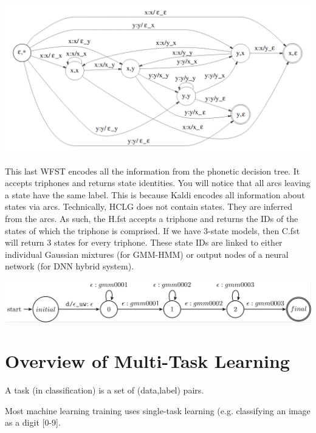 \documentclass[10pt,a4paper]{article}
\begin{document}
\begin{center}
  \includegraphics[width=.9\textwidth,keepaspectratio]{figs/mohri-C.png}
\end{center}

This last WFST encodes all the information from the phonetic decision tree. It accepts triphones and returns state identities. You will notice that all arcs leaving a state have the same label. This is because Kaldi encodes all information about states via arcs. Technically, HCLG does not contain states. They are inferred from the arcs. As such, the H.fst accepts a triphone and returns the IDs of the states of which the triphone is comprised. If we have 3-state models, then C.fst will return 3 states for every triphone. These state IDs are linked to either individual Gaussian mixtures (for GMM-HMM) or output nodes of a neural network (for DNN hybrid system).


\begin{center}
  \includegraphics[width=.9\textwidth,keepaspectratio]{figs/H-fst.png}
\end{center}











\newpage

\section{Overview of Multi-Task Learning}

A task (in classification) is a set of (data,label) pairs.

Most machine learning training uses single-task learning (e.g. classifying an image as a digit [0-9].
\end{document}

